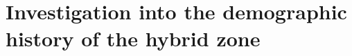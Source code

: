 \documentclass[a4paper,12pt,times,authoryear,twoside,print,index]{Classes/PhDThesisPSnPDF}\usepackage[]{graphicx}\usepackage[]{color}
\begin{document}
%

%





%
%
%



\ifpdf
    \graphicspath{
    {./Figs/Raster/}
    {./Figs/PDF/}
    {./Figs/}
    {../Data_analysis/reference-mapping/figure/}
    }
\else
    \graphicspath{ 
    {./Figs/Vector/}
    {./Figs/}
    }
\fi

%
%
%
\chapter{Investigation into the demographic history of the hybrid zone}
%
%
%

%
%
\end{document}
